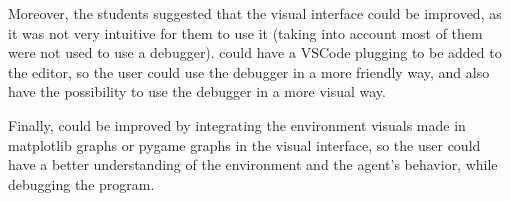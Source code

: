 Moreover, the students suggested that the visual interface could be improved, as it was not very 
intuitive for them to use it (taking into account most of them were not used to use a debugger).
\flik could have a VSCode plugging to be added to the editor, so the user could use the debugger 
in a more friendly way, and also have the possibility to use the debugger in a more visual way.

Finally, \flik could be improved by integrating the environment visuals made in matplotlib
graphs or pygame graphs in the visual interface, so the user could have a better understanding of 
the environment and the agent's behavior, while debugging the program.

